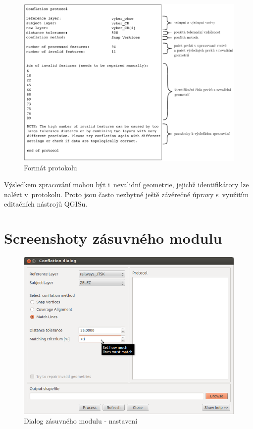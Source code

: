   \begin{figure}[ht]
    \centering
      \includegraphics[width=420pt]{./pictures/protokol.pdf}
      \caption{Formát protokolu}
      \label{fig:protokol}
  \end{figure} 

Výsledkem zpracování mohou být i~nevalidní geometrie, jejichž identifikátory lze
nalézt v~protokolu. Proto jsou často nezbytné ještě závěrečné úpravy s~využitím
editačních nástrojů QGISu.


\chapter{Screenshoty zásuvného modulu}
\label{priloha-screenshoty}

  \begin{figure}[H]
    \centering
      \includegraphics[width=360pt]{./pictures/dialog1.png}
      \caption{Dialog zásuvného modulu - nastavení}
      \label{fig:d1}
  \end{figure} 

